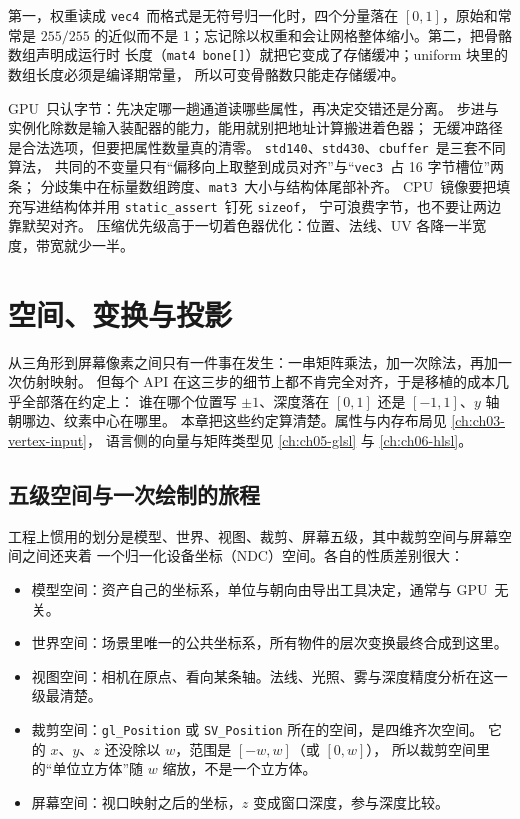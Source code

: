 \documentclass[12pt,a4paper,fontset=fandol]{ctexbook}
\newcommand{\Tp}[1]{\texttt{#1}}
\newcommand{\Lang}[1]{\textsf{#1}}
\newcommand{\DomCPU}{\Lang{CPU}}
\newcommand{\DomGPU}{\Lang{GPU}}
\begin{document}
\begin{warning}[title={蒙皮布局的两个隐蔽错误}]
  第一，权重读成 \Tp{vec4}\ 而格式是无符号归一化时，四个分量落在 $[0,1]$，原始和常常是
  $255/255$ 的近似而不是 1；忘记除以权重和会让网格整体缩小。第二，把骨骼数组声明成运行时
  长度（\Tp{mat4 bone[]}）就把它变成了存储缓冲；uniform 块里的数组长度必须是编译期常量，
  所以可变骨骼数只能走存储缓冲。
\end{warning}

\begin{guideline}[title={本章要点}]
  \DomGPU\ 只认字节：先决定哪一趟通道读哪些属性，再决定交错还是分离。
  步进与实例化除数是输入装配器的能力，能用就别把地址计算搬进着色器；
  无缓冲路径是合法选项，但要把属性数量真的清零。
  \Tp{std140}、\Tp{std430}、\Tp{cbuffer}\ 是三套不同算法，
  共同的不变量只有``偏移向上取整到成员对齐''与``\Tp{vec3}\ 占 16 字节槽位''两条；
  分歧集中在标量数组跨度、\Tp{mat3}\ 大小与结构体尾部补齐。
  \DomCPU\ 镜像要把填充写进结构体并用 \Tp{static\_assert}\ 钉死 \Tp{sizeof}，
  宁可浪费字节，也不要让两边靠默契对齐。
  压缩优先级高于一切着色器优化：位置、法线、UV 各降一半宽度，带宽就少一半。
\end{guideline}

\chapter{空间、变换与投影}
\label{ch:ch04-transform-space}

从三角形到屏幕像素之间只有一件事在发生：一串矩阵乘法，加一次除法，再加一次仿射映射。
但每个 API 在这三步的细节上都不肯完全对齐，于是移植的成本几乎全部落在约定上：
谁在哪个位置写 $\pm 1$、深度落在 $[0,1]$ 还是 $[-1,1]$、$y$ 轴朝哪边、纹素中心在哪里。
本章把这些约定算清楚。属性与内存布局见 \ref{ch:ch03-vertex-input}，
语言侧的向量与矩阵类型见 \ref{ch:ch05-glsl} 与 \ref{ch:ch06-hlsl}。

\section{五级空间与一次绘制的旅程}

工程上惯用的划分是模型、世界、视图、裁剪、屏幕五级，其中裁剪空间与屏幕空间之间还夹着
一个归一化设备坐标（NDC）空间。各自的性质差别很大：

\begin{itemize}
  \item 模型空间：资产自己的坐标系，单位与朝向由导出工具决定，通常与 \DomGPU\ 无关。
  \item 世界空间：场景里唯一的公共坐标系，所有物件的层次变换最终合成到这里。
  \item 视图空间：相机在原点、看向某条轴。法线、光照、雾与深度精度分析在这一级最清楚。
  \item 裁剪空间：\Tp{gl\_Position} 或 \Tp{SV\_Position} 所在的空间，是四维齐次空间。
        它的 $x$、$y$、$z$ 还没除以 $w$，范围是 $[-w, w]$（或 $[0, w]$），
        所以裁剪空间里的``单位立方体''随 $w$ 缩放，不是一个立方体。
  \item 屏幕空间：视口映射之后的坐标，$z$ 变成窗口深度，参与深度比较。
\end{itemize}
\end{document}

